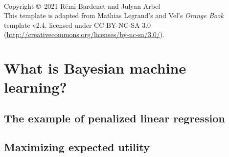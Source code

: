 \documentclass[11pt,fleqn]{book} %
\begin{document}



\newpage
~\vfill
\thispagestyle{empty}

\noindent Copyright \copyright\ 2021 Rémi Bardenet and Julyan Arbel\\ %


\noindent This template is adapted from Mathias Legrand's and Vel's
 \emph{Orange Book} template v2.4, licensed under CC BY-NC-SA 3.0
 (\url{http://creativecommons.org/licenses/by-nc-sa/3.0/}).



\pagestyle{empty} %
\tableofcontents %
\cleardoublepage %
\pagestyle{fancy} %

\part{What is Bayesian machine learning?}
    \chapter{The example of penalized linear regression}
    \label{ch:penalized_linear_regression}
    
    \chapter{Maximizing expected utility}
    \label{ch:expected_utility}
    
\end{document}
